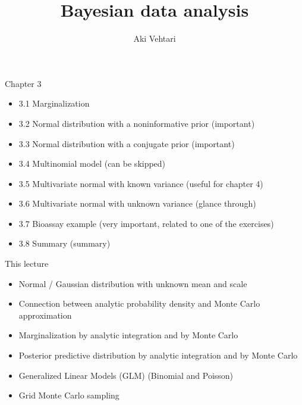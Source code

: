 \documentclass[finnish,english,t]{beamer}
\title[]{Bayesian data analysis}
\subtitle{}
\author{Aki Vehtari}
\institute[Aalto]{}
\begin{document}
\begin{frame}{Chapter 3}

  \begin{itemize}
\item 3.1 Marginalization
\item 3.2 Normal distribution with a noninformative prior (important)
\item 3.3 Normal distribution with a conjugate prior (important)
\item 3.4 Multinomial model (can be skipped)
\item 3.5 Multivariate normal with known variance (useful for chapter 4)
\item 3.6 Multivariate normal with unknown variance (glance through)
\item 3.7 Bioassay example (very important, related to one of the exercises)
\item 3.8 Summary (summary)
  \end{itemize}
\end{frame}

\begin{frame}{This lecture}

  \begin{itemize}
  \item Normal / Gaussian distribution with unknown mean and scale
  \item Connection between analytic probability density and Monte Carlo approximation
  \item Marginalization by analytic integration and by Monte Carlo
  \item Posterior predictive distribution by analytic integration and by Monte Carlo
  \item Generalized Linear Models (GLM) (Binomial and Poisson)
  \item Grid Monte Carlo sampling
  \end{itemize}
\end{frame}
\end{document}
